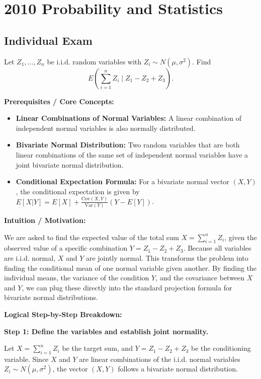 \section{2010 Probability and Statistics}

\subsection{Individual Exam}

\begin{exercise}\label{probability:2010:1}
Let $Z_1, \dots, Z_n$ be i.i.d. random variables with $Z_i \sim N(\mu, \sigma^2)$. Find
\[ E \left( \sum_{i=1}^n Z_i \mid Z_1 - Z_2 + Z_3 \right). \]
\end{exercise}

\begin{solution}
\textbf{Prerequisites / Core Concepts:}
\begin{itemize}
    \item \textbf{Linear Combinations of Normal Variables:} A linear combination of independent normal variables is also normally distributed.
    \item \textbf{Bivariate Normal Distribution:} Two random variables that are both linear combinations of the same set of independent normal variables have a joint bivariate normal distribution.
    \item \textbf{Conditional Expectation Formula:} For a bivariate normal vector $(X, Y)$, the conditional expectation is given by $E[X|Y] = E[X] + \frac{\text{Cov}(X, Y)}{\text{Var}(Y)} (Y - E[Y])$.
\end{itemize}

\textbf{Intuition / Motivation:}

We are asked to find the expected value of the total sum $X = \sum_{i=1}^n Z_i$, given the observed value of a specific combination $Y = Z_1 - Z_2 + Z_3$. Because all variables are i.i.d. normal, $X$ and $Y$ are jointly normal. This transforms the problem into finding the conditional mean of one normal variable given another. By finding the individual means, the variance of the condition $Y$, and the covariance between $X$ and $Y$, we can plug these directly into the standard projection formula for bivariate normal distributions.

\textbf{Logical Step-by-Step Breakdown:}

\textbf{Step 1: Define the variables and establish joint normality.}

Let $X = \sum_{i=1}^n Z_i$ be the target sum, and $Y = Z_1 - Z_2 + Z_3$ be the conditioning variable. Since $X$ and $Y$ are linear combinations of the i.i.d. normal variables $Z_i \sim N(\mu, \sigma^2)$, the vector $(X, Y)$ follows a bivariate normal distribution.


\end{solution}
